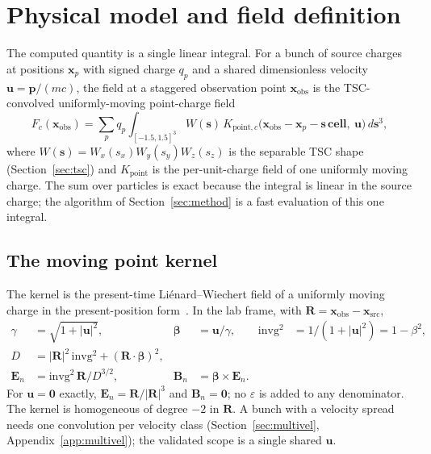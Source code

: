 \section{Physical model and field definition}
\label{sec:fielddef}

The computed quantity is a single linear integral. For a bunch of source
charges at positions $\mathbf{x}_p$ with signed charge $q_p$ and a shared
dimensionless velocity $\mathbf{u}=\mathbf{p}/(mc)$, the field at a
staggered observation point $\mathbf{x}_{\mathrm{obs}}$ is the
TSC-convolved uniformly-moving point-charge field
\begin{equation}
\label{eq:Fc}
F_c(\mathbf{x}_{\mathrm{obs}})
=
\sum_p q_p \int_{[-1.5,1.5]^3}
W(\mathbf{s})\,
K_{\mathrm{point},c}\!\bigl(\mathbf{x}_{\mathrm{obs}}
- \mathbf{x}_p - \mathbf{s}\,\mathbf{cell},\ \mathbf{u}\bigr)
\,d\mathbf{s}^3 ,
\end{equation}
where $W(\mathbf{s})=W_x(s_x)W_y(s_y)W_z(s_z)$ is the separable TSC shape
(Section~\ref{sec:tsc}) and $K_{\mathrm{point}}$ is the per-unit-charge
field of one uniformly moving charge. The sum over particles is exact
because the integral is linear in the source charge; the algorithm of
Section~\ref{sec:method} is a fast evaluation of this one integral.

\subsection{The moving point kernel}

The kernel is the present-time Li\'enard--Wiechert field of a uniformly
moving charge in the present-position form~\citep{jackson2007,landau1975}.
In the lab frame, with $\mathbf{R}=\mathbf{x}_{\mathrm{obs}}-\mathbf{x}_{\mathrm{src}}$,
\begin{align}
\gamma &= \sqrt{1+|\mathbf{u}|^2}, &
\boldsymbol{\beta} &= \mathbf{u}/\gamma, &
\mathrm{invg}^2 &= 1/(1+|\mathbf{u}|^2) = 1-\beta^2,\\
D &= |\mathbf{R}|^2\,\mathrm{invg}^2 + (\mathbf{R}\!\cdot\!\boldsymbol{\beta})^2,\\
\mathbf{E}_n &= \mathrm{invg}^2\,\mathbf{R}/D^{3/2}, &
\mathbf{B}_n &= \boldsymbol{\beta}\times \mathbf{E}_n .
\end{align}
For $\mathbf{u}=\mathbf{0}$ exactly, $\mathbf{E}_n=\mathbf{R}/|\mathbf{R}|^3$
and $\mathbf{B}_n=\mathbf{0}$; no $\varepsilon$ is added to any denominator.
The kernel is homogeneous of degree $-2$ in $\mathbf{R}$. A bunch with a
velocity spread needs one convolution per velocity class
(Section~\ref{sec:multivel}, Appendix~\ref{app:multivel}); the validated
scope is a single shared $\mathbf{u}$.

